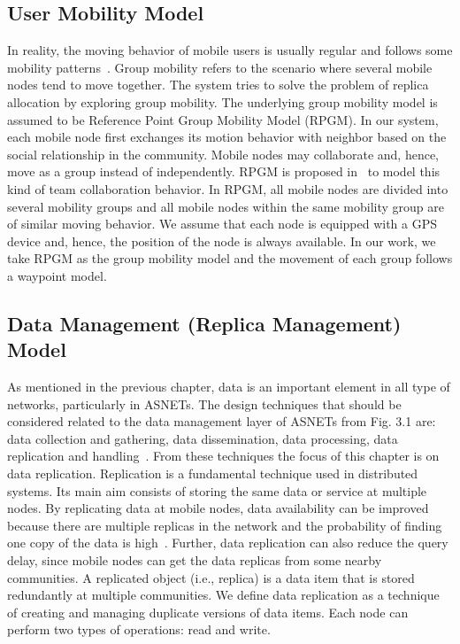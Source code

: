 \subsection{User Mobility Model}\label{Chap4_03_02}
In reality, the moving behavior of mobile users is usually regular and follows some mobility patterns~\cite{WCPeng2003}\cite{HKWu2001}. Group mobility refers to the scenario where several mobile nodes tend to move together. The system tries to solve the problem of replica allocation by exploring group mobility. The underlying group mobility model is assumed to be Reference Point Group Mobility Model (RPGM). In our system, each mobile node first exchanges its motion behavior with neighbor based on the social relationship in the community. Mobile nodes may collaborate and, hence, move as a group instead of independently. RPGM is proposed in~\cite{JLHuang2006} to model this kind of team collaboration behavior. In RPGM, all mobile nodes are divided into several mobility groups and all mobile nodes within the same mobility group are of similar moving behavior. We assume that each node is equipped with a GPS device and, hence, the position of the node is always available. In our work, we take RPGM as the group mobility model and the movement of each group follows a waypoint model.

\subsection{Data Management (Replica Management) Model}\label{Chap4_03_03}
As mentioned in the previous chapter, data is an important element in all type of networks, particularly in ASNETs. The design techniques that should be considered related to the data management layer of ASNETs from Fig. 3.1 are: data collection and gathering, data dissemination, data processing, data replication and handling~\cite{CSengul2012}. From these techniques the focus of this chapter is on data replication. Replication is a fundamental technique used in distributed systems. Its main aim consists of storing the same data or service at multiple nodes. By replicating data at mobile nodes, data availability can be improved because there are multiple replicas in the network and the probability of finding one copy of the data is high~\cite{ADerhab2009}. Further, data replication can also reduce the query delay, since mobile nodes can get the data replicas from some nearby communities. A replicated object (i.e., replica) is a data item that is stored redundantly at multiple communities. We define data replication as a technique of creating and managing duplicate versions of data items. Each node can perform two types of operations: read and write.

